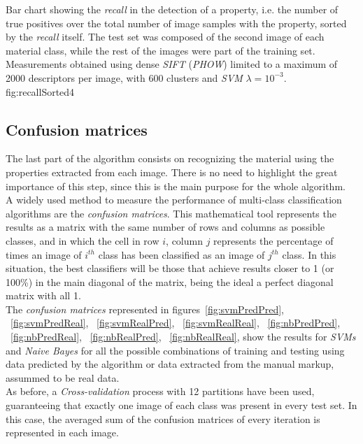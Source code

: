 {Bar chart showing the \emph{recall} in the detection of a property, i.e. the number of true positives over the total number of image samples with the property, sorted by the \emph{recall} itself. The test set was composed of the second image of each material class, while the rest of the images were part of the training set. Measurements obtained using dense \emph{SIFT} (\emph{PHOW}) limited to a maximum of 2000 descriptors per image, with 600 clusters and \emph{SVM} $\lambda=10^{-3}$.}
{fig:recallSorted4}



\subsection{Confusion matrices}

The last part of the algorithm consists on recognizing the material using the properties extracted from each image. There is no need to highlight the great importance of this step, since this is the main purpose for the whole algorithm. \\

A widely used method to measure the performance of multi-class classification algorithms are the \emph{confusion matrices}. This mathematical tool represents the results as a matrix with the same number of rows and columns as possible classes, and in which the cell in row $i$, column $j$ represents the percentage of times an image of $i^{th}$ class has been classified as an image of $j^{th}$ class. In this situation, the best classifiers will be those that achieve results closer to 1 (or 100\%) in the main diagonal of the matrix, being the ideal a perfect diagonal matrix with all 1. \\

The \emph{confusion matrices} represented in figures~\ref{fig:svmPredPred}, ~\ref{fig:svmPredReal}, ~\ref{fig:svmRealPred}, ~\ref{fig:svmRealReal}, ~\ref{fig:nbPredPred}, ~\ref{fig:nbPredReal}, ~\ref{fig:nbRealPred}, ~\ref{fig:nbRealReal}, show the results for \emph{SVMs} and \emph{Naive Bayes} for all the possible combinations of training and testing using data predicted by the algorithm or data extracted from the manual markup, assummed to be real data. \\

As before, a \emph{Cross-validation} process with 12 partitions have been used, guaranteeing that exactly one image of each class was present in every test set. In this case, the averaged sum of the confusion matrices of every iteration is represented in each image. \\

